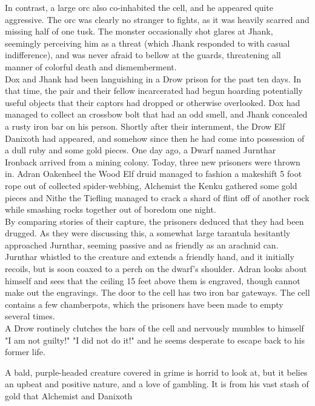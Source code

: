 \documentclass[letterpaper,10pt,twoside,twocolumn,openany]{book}
\begin{document}
In contrast, a large orc also co-inhabited the cell, and he appeared quite aggressive. The orc was clearly no stranger to fights, as it was heavily scarred and missing half of one tusk. The monster occasionally shot glares at Jhank, seemingly perceiving him as a threat (which Jhank responded to with casual indifference), and was never afraid to bellow at the guards, threatening all manner of colorful death and dismemberment.\\

Dox and Jhank had been languishing in a Drow prison for the past ten days. In that time, the pair and their fellow incarcerated had begun hoarding potentially useful objects that their captors had dropped or otherwise overlooked. Dox had managed to collect an crossbow bolt that had an odd smell, and Jhank concealed a rusty iron bar on his person. Shortly after their internment, the Drow Elf Danixoth had appeared, and somehow since then he had come into possession of a dull ruby and some gold pieces. One day ago, a Dwarf named Jurnthar Ironback arrived from a mining colony. Today, three new prisoners were thrown in. Adran Oakenheel the Wood Elf druid managed to fashion a makeshift 5 foot rope out of collected spider-webbing, Alchemist the Kenku gathered some gold pieces and Nithe the Tiefling managed to crack a shard of flint off of another rock while smashing rocks together out of boredom one night.\\

By comparing stories of their capture, the prisoners deduced that they had been drugged. As they were discussing this, a somewhat large tarantula hesitantly approached Jurnthar, seeming passive and as friendly as an arachnid can. Jurnthar whistled to the creature and extends a friendly hand, and it initially recoils, but is soon coaxed to a perch on the dwarf's shoulder. Adran looks about himself and sees that the ceiling 15 feet above them is engraved, though cannot make out the engravings. The door to the cell has two iron bar gateways. The cell contains a few chamberpots, which the prisoners have been made to empty several times.\\

A Drow routinely clutches the bars of the cell and nervously mumbles to himself "I am not guilty!" "I did not do it!" and he seems desperate to escape back to his former life.

A bald, purple-headed creature covered in grime is horrid to look at, but it belies an upbeat and positive nature, and a love of gambling. It is from his vast stash of gold that Alchemist and Danixoth 
\end{document}
